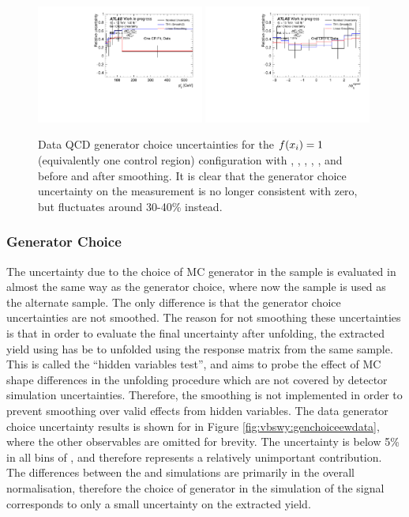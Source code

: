 \begin{figure}[t]
  \includegraphics[width=0.49\textwidth]{plots/diffx/genchoice/data/sys_errors_lep_pt_generator_choice_1cr.pdf}
  \includegraphics[width=0.49\textwidth]{plots/diffx/genchoice/data/sys_errors_lepgam_dphi_generator_choice_1cr.pdf}
  \caption{Data QCD generator choice uncertainties for the $f(x_i)=1$ (equivalently one control region) configuration with \mjj, \ptjj, \dphisigned, \mly, \leppt, and \lepgamdphi before and after smoothing. It is clear that the generator choice uncertainty on the measurement is no longer consistent with zero, but fluctuates around 30-40\% instead.}
  \label{fig:vbswy:genchoicedataonecr}
\end{figure}


\subsubsection{\ewwy Generator Choice}

The uncertainty due to the choice of MC generator in the \ewwy sample is evaluated in almost the same way as the \qcdwy generator choice, where now the \MADGRAPH \ewwy sample is used as the alternate sample. The only difference is that the \ewwy generator choice uncertainties are not smoothed. The reason for not smoothing these uncertainties is that in order to evaluate the final uncertainty after unfolding, the extracted yield using \MADGRAPH has be to unfolded using the response matrix from the same sample. This is called the ``hidden variables test'', and aims to probe the effect of MC shape differences in the unfolding procedure which are not covered by detector simulation uncertainties. Therefore, the smoothing is not implemented in order to prevent smoothing over valid effects from hidden variables. The data \ewwy generator choice uncertainty results is shown for \mjj in Figure \ref{fig:vbswy:genchoiceewdata}, where the other observables are omitted for brevity. The uncertainty is below 5\% in all bins of \mjj, and therefore represents a relatively unimportant contribution. The differences between the \SHERPA and \MADGRAPH \ewwy simulations are primarily in the overall normalisation, therefore the choice of generator in the simulation of the signal corresponds to only a small uncertainty on the extracted \ewwy yield.


